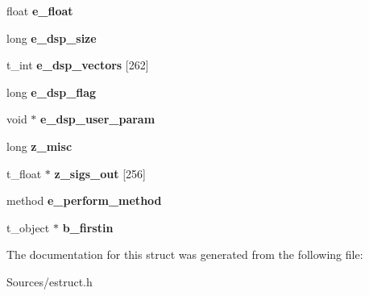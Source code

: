 \begin{DoxyCompactItemize}
\item 
\hypertarget{struct__ebox_ad30a7d21f486f593958971d3b9ec36d3}{float {\bfseries e\-\_\-float}}\label{struct__ebox_ad30a7d21f486f593958971d3b9ec36d3}

\item 
\hypertarget{struct__ebox_a34d2b509590074485b75c6efb80f2a8a}{long {\bfseries e\-\_\-dsp\-\_\-size}}\label{struct__ebox_a34d2b509590074485b75c6efb80f2a8a}

\item 
\hypertarget{struct__ebox_a37a74c1a71f50b83a5da00975519ea27}{t\-\_\-int {\bfseries e\-\_\-dsp\-\_\-vectors} \mbox{[}262\mbox{]}}\label{struct__ebox_a37a74c1a71f50b83a5da00975519ea27}

\item 
\hypertarget{struct__ebox_a6298f74f2639c64139da990534dc8787}{long {\bfseries e\-\_\-dsp\-\_\-flag}}\label{struct__ebox_a6298f74f2639c64139da990534dc8787}

\item 
\hypertarget{struct__ebox_a7753518284f1a6af6e251c772f17ce39}{void $\ast$ {\bfseries e\-\_\-dsp\-\_\-user\-\_\-param}}\label{struct__ebox_a7753518284f1a6af6e251c772f17ce39}

\item 
\hypertarget{struct__ebox_a9aec3dacaf034534f15e857f265fa049}{long {\bfseries z\-\_\-misc}}\label{struct__ebox_a9aec3dacaf034534f15e857f265fa049}

\item 
\hypertarget{struct__ebox_a8d714274ffedfe180845fe82312dc9a5}{t\-\_\-float $\ast$ {\bfseries z\-\_\-sigs\-\_\-out} \mbox{[}256\mbox{]}}\label{struct__ebox_a8d714274ffedfe180845fe82312dc9a5}

\item 
\hypertarget{struct__ebox_a4d9ad4da3e6b40edec20a9ffa81921a6}{method {\bfseries e\-\_\-perform\-\_\-method}}\label{struct__ebox_a4d9ad4da3e6b40edec20a9ffa81921a6}

\item 
\hypertarget{struct__ebox_af361e9a708c6555e227a03251ddc56c3}{t\-\_\-object $\ast$ {\bfseries b\-\_\-firstin}}\label{struct__ebox_af361e9a708c6555e227a03251ddc56c3}

\end{DoxyCompactItemize}


The documentation for this struct was generated from the following file\-:\begin{DoxyCompactItemize}
\item 
Sources/estruct.\-h\end{DoxyCompactItemize}
